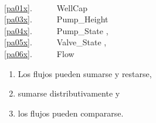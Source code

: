 \mnewfoil\LLLL\HHHH%

\bp
\>\ \\
\ref{pa01x}.\ \ \ \ \ \ WellCap \\
\ref{pa03x}.\ \ \ \ \ \ Pump\_Height \\
\ref{pa04x}.\ \ \ \ \ \ Pump\_State {\EQ}{\EQ} {\LBRACE}{\BAR}, \\
\ref{pa05x}.\ \ \ \ \ \ Valve\_State {\EQ}{\EQ} {\LBRACE}{\BAR}, \\
\ref{pa06x}.\ \ \ \ \ \ Flow 
\ep
\begin{enumerate}\setei
\item \label{pa05y1} Los flujos pueden sumarse y restarse,
\item \label{pa05y2} sumarse distributivamente y
\item \label{pa05z} los flujos pueden compararse.
\savei\end{enumerate}

